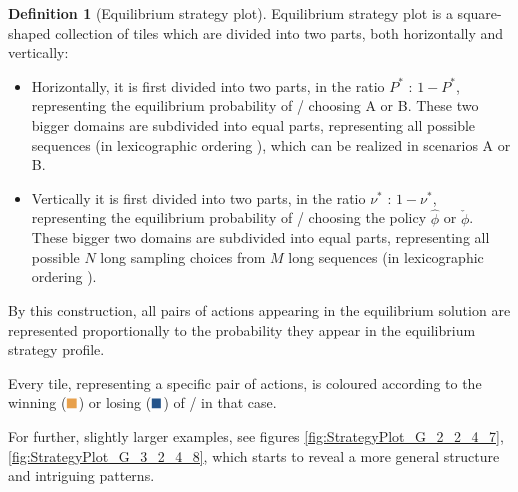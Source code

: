 \documentclass{article}
\newcommand{\wbox}{\textcolor{w}{\blacksquare}}
\newcommand{\lbox}{\textcolor{l}{\blacksquare}}
\theoremstyle{definition}
\newtheorem{definition}{Definition}[section]
\begin{document}
\begin{definition}[Equilibrium strategy plot]
Equilibrium strategy plot is a square-shaped collection of tiles which are divided into two parts, both horizontally and vertically:

\begin{itemize}
    \item Horizontally, it is first divided into two parts, in the ratio $P^*$ : $1-P^*$, representing the equilibrium probability of \PII/ choosing A or B. These two bigger domains are subdivided into equal parts, representing all possible sequences (in lexicographic ordering \cite{book:OrderedSets}), which can be realized in scenarios A or B.
    \item Vertically it is first divided into two parts, in the ratio $\nu^*$ : $1-\nu^*$, representing the equilibrium probability of \PI/ choosing the policy $\hat{\phi}$ or $\check{\phi}$. These bigger two domains are subdivided into equal parts, representing all possible $N$ long sampling choices from $M$ long sequences (in lexicographic ordering \cite{book:OrderedSets}).
\end{itemize}

By this construction, all pairs of actions appearing in the equilibrium solution are represented proportionally to the probability they appear in the equilibrium strategy profile.

Every tile, representing a specific pair of actions, is coloured according to the winning ($\wbox$) or losing ($\lbox$) of \PI/ in that case.

\end{definition}

For further, slightly larger examples, see figures \ref{fig:StrategyPlot_G_2_2_4_7}, \ref{fig:StrategyPlot_G_3_2_4_8}, which starts to reveal a more general structure and intriguing patterns.
\end{document}
